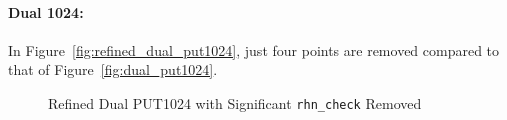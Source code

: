 \documentclass[10pt]{article}
\begin{document}
\paragraph{Dual 1024:} In Figure~\ref{fig:refined_dual_put1024}, just four points are removed compared to that of Figure~\ref{fig:dual_put1024}.

\begin{figure}[htp!]
	\centering
	\caption{Refined Dual PUT1024 with Significant {\tt rhn\_check} Removed~\label{fig:new_put1024}}
\end{figure}
\end{document}
